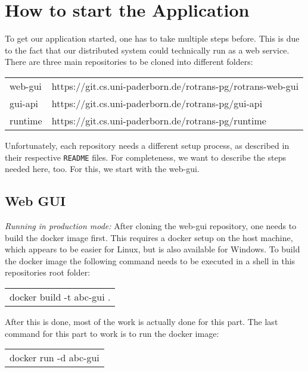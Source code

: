 \section{How to start the Application}

To get our application started, one has to take multiple steps before. This is due to the fact that our distributed system could technically run as a web service.
There are three main repositories to be cloned into different folders:

\vspace{2mm}
\begin{tabular}{ll}
	web-gui & https://git.cs.uni-paderborn.de/rotrans-pg/rotrans-web-gui \\
	gui-api & https://git.cs.uni-paderborn.de/rotrans-pg/gui-api \\
	runtime & https://git.cs.uni-paderborn.de/rotrans-pg/runtime \\	
\end{tabular}
\vspace{2mm}

Unfortunately, each repository needs a different setup process, as described in their respective \texttt{README} files. For completeness, we want to describe the steps needed here, too. For this, we start with the web-gui.

\subsection*{Web GUI}
\textit{Running in production mode:} After cloning the web-gui repository, one needs to build the docker image first. This requires a docker setup on the host machine, which appears to be easier for Linux, but is also available for Windows. To build the docker image the following command needs to be executed in a shell in this repositories root folder:

\vspace{2mm}
\begin{tabular}{l}
	docker build -t abc-gui . 
\end{tabular}

\vspace{2mm}
After this is done, most of the work is actually done for this part. The last command for this part to work is to run the docker image:

\vspace{2mm}
\begin{tabular}{l}
	docker run -d abc-gui
\end{tabular}
\vspace{2mm}

